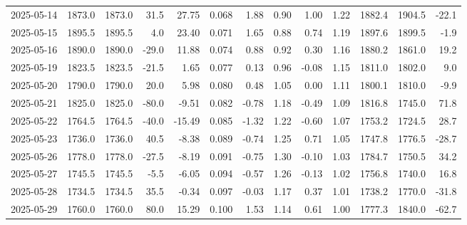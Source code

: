\begin{tabularx}{\textwidth}{@{}c
  r r r r r r r r r r r r@{}}
2025-05-14 & 1873.0 & 1873.0 &  31.5 & 27.75 & 0.068& 1.88  & 0.90 &  1.00 & 1.22& 1882.4 & 1904.5 & -22.1\\
2025-05-15 & 1895.5 & 1895.5 &   4.0 & 23.40 & 0.071& 1.65  & 0.88 &  0.74 & 1.19& 1897.6 & 1899.5 &  -1.9\\
2025-05-16 & 1890.0 & 1890.0 & -29.0 & 11.88 & 0.074& 0.88  & 0.92 &  0.30 & 1.16& 1880.2 & 1861.0 &  19.2\\
2025-05-19 & 1823.5 & 1823.5 & -21.5 &  1.65 & 0.077& 0.13  & 0.96 & -0.08 & 1.15& 1811.0 & 1802.0 &   9.0\\
2025-05-20 & 1790.0 & 1790.0 &  20.0 &  5.98 & 0.080& 0.48  & 1.05 &  0.00 & 1.11& 1800.1 & 1810.0 &  -9.9\\
2025-05-21 & 1825.0 & 1825.0 & -80.0 & -9.51 & 0.082& -0.78 & 1.18 & -0.49 & 1.09& 1816.8 & 1745.0 &  71.8\\
2025-05-22 & 1764.5 & 1764.5 & -40.0 & -15.49& 0.085& -1.32 & 1.22 & -0.60 & 1.07& 1753.2 & 1724.5 &  28.7\\
2025-05-23 & 1736.0 & 1736.0 &  40.5 & -8.38 & 0.089& -0.74 & 1.25 &  0.71 & 1.05& 1747.8 & 1776.5 & -28.7\\
2025-05-26 & 1778.0 & 1778.0 & -27.5 & -8.19 & 0.091& -0.75 & 1.30 & -0.10 & 1.03& 1784.7 & 1750.5 &  34.2\\
2025-05-27 & 1745.5 & 1745.5 &  -5.5 & -6.05 & 0.094& -0.57 & 1.26 & -0.13 & 1.02& 1756.8 & 1740.0 &  16.8\\
2025-05-28 & 1734.5 & 1734.5 &  35.5 & -0.34 & 0.097& -0.03 & 1.17 &  0.37 & 1.01& 1738.2 & 1770.0 & -31.8\\
2025-05-29 & 1760.0 & 1760.0 &  80.0 & 15.29 & 0.100& 1.53  & 1.14 &  0.61 & 1.00& 1777.3 & 1840.0 & -62.7\\
\bottomrule
\end{tabularx}

\bigskip
